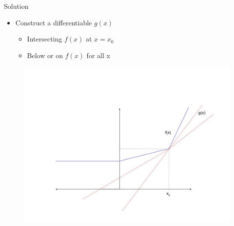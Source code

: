 \documentclass{beamer}
\begin{document}
\begin{frame}{Solution}

\begin{itemize}
\item Construct a differentiable $g(x)$ 
\begin{itemize}
\item Intersecting $f(x)$ at $x = x_0$
\item Below or on $f(x)$ for all x
\end{itemize}
\end{itemize}
\begin{figure}
\centering
\includegraphics[scale = 0.25]{../assets/lasso-regression/diagrams/subgradient_2.jpg}
\label{fig:my_label}
\end{figure}
\end{frame}
\end{document}
